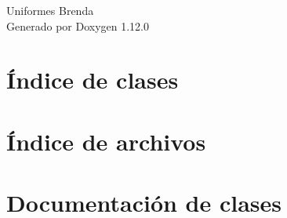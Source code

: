 \documentclass[twoside]{book}
\newcommand{\+}{\discretionary{\mbox{\scriptsize$\hookleftarrow$}}{}{}}
\newcommand{\clearemptydoublepage}{%
    \newpage{\pagestyle{empty}\cleardoublepage}%
  }
\begin{document}
  \raggedbottom
    \hypersetup{pageanchor=false,
                bookmarksnumbered=true,
                pdfencoding=unicode
               }
  \begin{titlepage}
  \vspace*{7cm}
  \begin{center}%
  {\Large Uniformes Brenda}\\
  \vspace*{1cm}
  {\large Generado por Doxygen 1.12.0}\\
  \end{center}
  \end{titlepage}
  \clearemptydoublepage
  \tableofcontents
  \clearemptydoublepage
  \hypersetup{pageanchor=true}
\chapter{Índice de clases}

\chapter{Índice de archivos}

\chapter{Documentación de clases}





























\end{document}
